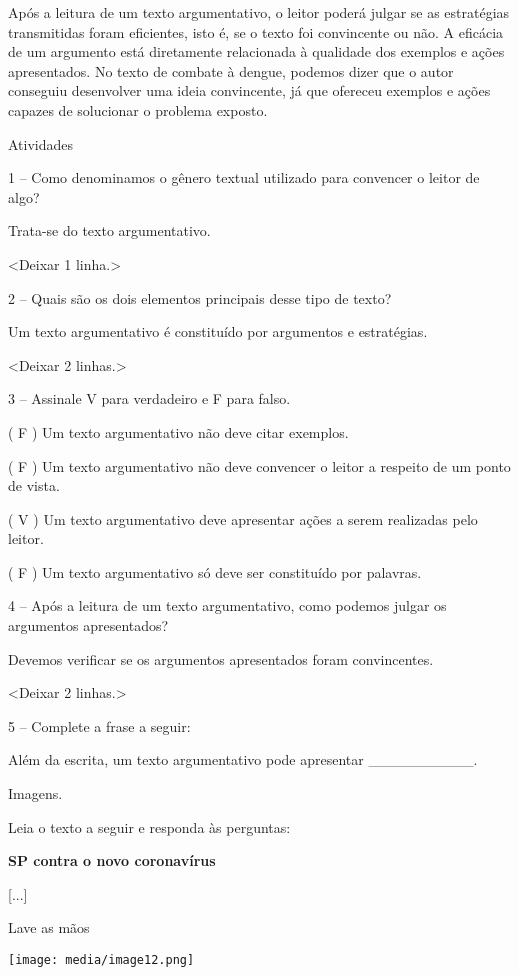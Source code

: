 Após a leitura de um texto argumentativo, o leitor poderá julgar se as
estratégias transmitidas foram eficientes, isto é, se o texto foi
convincente ou não. A eficácia de um argumento está diretamente
relacionada à qualidade dos exemplos e ações apresentados. No texto de
combate à dengue, podemos dizer que o autor conseguiu desenvolver uma
ideia convincente, já que ofereceu exemplos e ações capazes de
solucionar o problema exposto.

Atividades

1 -- Como denominamos o gênero textual utilizado para convencer o leitor
de algo?

Trata-se do texto argumentativo.

\textless{}Deixar 1 linha.\textgreater{}

2 -- Quais são os dois elementos principais desse tipo de texto?

Um texto argumentativo é constituído por argumentos e estratégias.

\textless{}Deixar 2 linhas.\textgreater{}

3 -- Assinale V para verdadeiro e F para falso.

( F ) Um texto argumentativo não deve citar exemplos.

( F ) Um texto argumentativo não deve convencer o leitor a respeito de
um ponto de vista.

( V ) Um texto argumentativo deve apresentar ações a serem realizadas
pelo leitor.

( F ) Um texto argumentativo só deve ser constituído por palavras.

4 -- Após a leitura de um texto argumentativo, como podemos julgar os
argumentos apresentados?

Devemos verificar se os argumentos apresentados foram convincentes.

\textless{}Deixar 2 linhas.\textgreater{}

5 -- Complete a frase a seguir:

Além da escrita, um texto argumentativo pode apresentar
\_\_\_\_\_\_\_\_\_\_.

Imagens.

Leia o texto a seguir e responda às perguntas:

\textbf{SP contra o novo coronavírus}

{[}...{]}

Lave as mãos

\texttt{[image: media/image12.png]}

